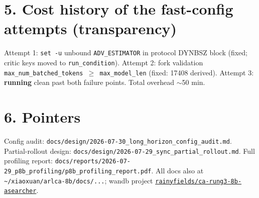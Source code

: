 \documentclass[10pt]{article}
\newcommand{\code}[1]{\texttt{\small #1}}
\newcommand{\run}{\textcolor{orange!85!black}{\textbf{running}}}
\begin{document}
\section*{5. Cost history of the fast-config attempts (transparency)}
Attempt 1: \code{set -u} unbound \code{ADV\_ESTIMATOR} in protocol DYNBSZ block (fixed; critic keys moved to \code{run\_condition}).
Attempt 2: fork validation \code{max\_num\_batched\_tokens $\ge$ max\_model\_len} (fixed: 17408 derived).
Attempt 3: \run{} clean past both failure points. Total overhead $\sim$50 min.

\section*{6. Pointers}
Config audit: \code{docs/design/2026-07-30\_long\_horizon\_config\_audit.md}. Partial-rollout design:
\code{docs/design/2026-07-29\_sync\_partial\_rollout.md}. Full profiling report:
\code{docs/reports/2026-07-29\_p8b\_profiling/p8b\_profiling\_report.pdf}. All docs also at
\code{\~{}/xiaoxuan/arlca-8b/docs/...}; wandb project
\href{https://wandb.ai/rainyfields/ca-rung3-8b-asearcher}{\code{rainyfields/ca-rung3-8b-asearcher}}.
\end{document}
